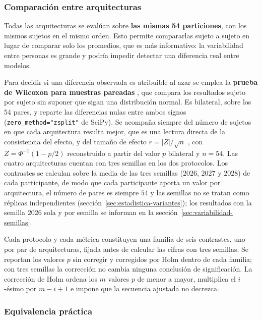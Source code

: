 \subsubsection{Comparación entre arquitecturas}

Todas las arquitecturas se evalúan sobre \textbf{las mismas 54 particiones}, con
los mismos sujetos en el mismo orden. Esto permite compararlas sujeto a sujeto en
lugar de comparar solo los promedios, que es más informativo: la variabilidad
entre personas es grande y podría impedir detectar una diferencia real entre modelos.

Para decidir si una diferencia observada es atribuible al azar se emplea la
\textbf{prueba de Wilcoxon para muestras pareadas} \cite{wilcoxon1945}, que compara los
resultados sujeto por sujeto sin suponer que sigan una distribución normal. Es bilateral,
sobre los $54$ pares, y reparte las diferencias nulas entre ambos signos
(\texttt{zero\_method="zsplit"} de SciPy). Se acompaña
siempre del número de sujetos en que cada arquitectura resulta mejor, que es una
lectura directa de la consistencia del efecto, y del tamaño de efecto
$r = |Z|/\sqrt{n}$ \cite{fritz2012}, con $Z = \Phi^{-1}(1 - p/2)$ reconstruido a partir del
valor $p$ bilateral y $n = 54$. Las cuatro arquitecturas cuentan con tres
semillas en los dos protocolos. Los contrastes se calculan sobre la media de las tres semillas
($2026$, $2027$ y $2028$) de cada participante, de modo que cada participante aporta un valor por
arquitectura, el número de pares es siempre $54$ y las semillas no se tratan como réplicas
independientes (sección~\ref{sec:estadistica-variantes}); los resultados con la
semilla $2026$ sola y por semilla se informan en la
sección~\ref{sec:variabilidad-semillas}.

Cada protocolo y cada métrica constituyen una familia de seis contrastes, uno por par de
arquitecturas, fijada antes de calcular las cifras con tres semillas. Se reportan los valores $p$
sin corregir y corregidos por Holm \cite{holm1979} dentro de cada familia; con tres semillas la
corrección no cambia ninguna conclusión de significación. La corrección de Holm ordena
los $m$ valores $p$ de menor a mayor, multiplica el $i$-ésimo por $m - i + 1$ e impone que
la secuencia ajustada no decrezca.

\subsubsection{Equivalencia práctica}
\label{sec:equivalencia}

